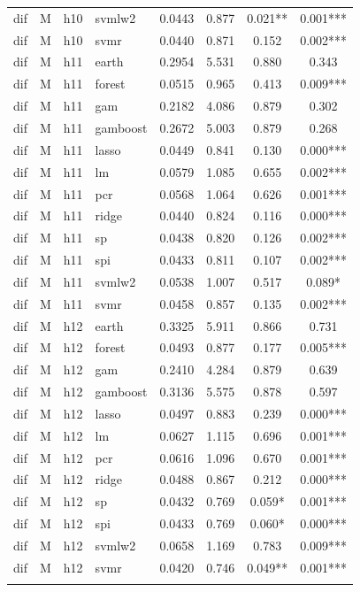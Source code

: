 \begin{ThreePartTable}
\begin{longtable}[t]{llclcccc}
dif & M & h10 & svmlw2 & 0.0443 & 0.877 & 0.021** & 0.001***\\
dif & M & h10 & svmr & 0.0440 & 0.871 & 0.152 & 0.002***\\
\addlinespace
dif & M & h11 & earth & 0.2954 & 5.531 & 0.880 & 0.343\\
dif & M & h11 & forest & 0.0515 & 0.965 & 0.413 & 0.009***\\
dif & M & h11 & gam & 0.2182 & 4.086 & 0.879 & 0.302\\
dif & M & h11 & gamboost & 0.2672 & 5.003 & 0.879 & 0.268\\
dif & M & h11 & lasso & 0.0449 & 0.841 & 0.130 & 0.000***\\
dif & M & h11 & lm & 0.0579 & 1.085 & 0.655 & 0.002***\\
dif & M & h11 & pcr & 0.0568 & 1.064 & 0.626 & 0.001***\\
dif & M & h11 & ridge & 0.0440 & 0.824 & 0.116 & 0.000***\\
dif & M & h11 & sp & 0.0438 & 0.820 & 0.126 & 0.002***\\
dif & M & h11 & spi & 0.0433 & 0.811 & 0.107 & 0.002***\\
dif & M & h11 & svmlw2 & 0.0538 & 1.007 & 0.517 & 0.089*\\
dif & M & h11 & svmr & 0.0458 & 0.857 & 0.135 & 0.002***\\
\addlinespace
dif & M & h12 & earth & 0.3325 & 5.911 & 0.866 & 0.731\\
dif & M & h12 & forest & 0.0493 & 0.877 & 0.177 & 0.005***\\
dif & M & h12 & gam & 0.2410 & 4.284 & 0.879 & 0.639\\
dif & M & h12 & gamboost & 0.3136 & 5.575 & 0.878 & 0.597\\
dif & M & h12 & lasso & 0.0497 & 0.883 & 0.239 & 0.000***\\
dif & M & h12 & lm & 0.0627 & 1.115 & 0.696 & 0.001***\\
dif & M & h12 & pcr & 0.0616 & 1.096 & 0.670 & 0.001***\\
dif & M & h12 & ridge & 0.0488 & 0.867 & 0.212 & 0.000***\\
dif & M & h12 & sp & 0.0432 & 0.769 & 0.059* & 0.001***\\
dif & M & h12 & spi & 0.0433 & 0.769 & 0.060* & 0.000***\\
dif & M & h12 & svmlw2 & 0.0658 & 1.169 & 0.783 & 0.009***\\
dif & M & h12 & svmr & 0.0420 & 0.746 & 0.049** & 0.001***\\
\addlinespace

\end{longtable}
\end{ThreePartTable}
